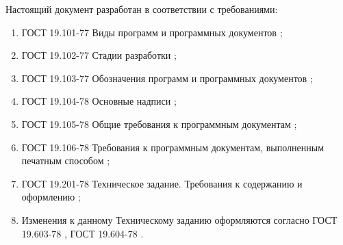 Настоящий документ разработан в соответствии с требованиями:
\begin{enumerate}[1)]
	\item ГОСТ 19.101-77 Виды программ и программных документов \cite{gost:19.101-77};
	\item ГОСТ 19.102-77 Стадии разработки \cite{gost:19.102-77};
	\item ГОСТ 19.103-77 Обозначения программ и программных документов \cite{gost:19.103-77};
	\item ГОСТ 19.104-78 Основные надписи \cite{gost:19.104-78};
	\item ГОСТ 19.105-78 Общие требования к программным документам \cite{gost:19.105-78};
	\item ГОСТ 19.106-78 Требования к программным документам, выполненным печатным способом \cite{gost:19.106-78};
	\item ГОСТ 19.201-78 Техническое задание. Требования к содержанию и оформлению \cite{gost:19.201-78};
	\item Изменения к данному Техническому заданию оформляются согласно ГОСТ 19.603-78 \cite{gost:19.603-78}, ГОСТ 19.604-78 \cite{gost:19.604-78}.
\end{enumerate}

\clearpage